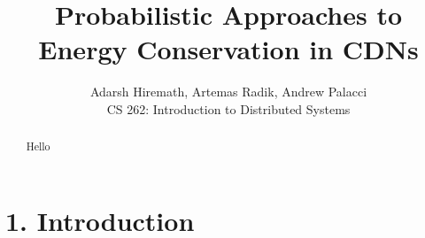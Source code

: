 \documentclass[
	a4paper, %
	10pt, %
	unnumberedsections, %
	twoside, %
]{LTJournalArticle}
\title{Probabilistic Approaches to 
\\ Energy Conservation in CDNs} %
\author{%
	Adarsh Hiremath, Artemas Radik, Andrew Palacci \\
	CS 262: Introduction to Distributed Systems \\
}
\begin{document}
\maketitle %


\begin{abstract}
    Hello
\end{abstract}
\section{1. Introduction}






\end{document}
